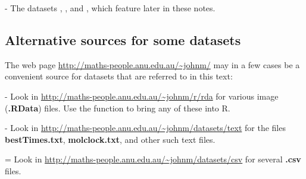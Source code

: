 \begin{itemizz}
\begin{marginfigure}[54pt]
\begin{knitrout}
\end{knitrout}
\end{marginfigure}
\begin{knitrout}
\color{fgcolor}\begin{kframe}
\begin{alltt}
 \hlkwb{<-} \hlstd{(}\hlstd{,}
                          \hlstd{=}\hlstd{)}
\end{alltt}
\end{kframe}
\end{knitrout}
\item[-] The datasets , , and
  , which feature later in these notes.
\end{itemizz}
\newpage

\subsection*{Alternative sources for some datasets}
{\color{gray40}
The web page \url{http://maths-people.anu.edu.au/~johnm/} may in a few cases
be a convenient source for datasets that are referred to in this text:
\begin{itemizz}
\item[-] 
Look in \url{http://maths-people.anu.edu.au/~johnm/r/rda} for
  various image ({\bf .RData}) files.  Use the function  to bring any of these 
  into R.
\item[-] Look in \url{http://maths-people.anu.edu.au/~johnm/datasets/text}
  for the files {\bf bestTimes.txt}, {\bf molclock.txt}, and other such
  text files.
\item[=] Look in \url{http://maths-people.anu.edu.au/~johnm/datasets/csv}
  for several {\bf .csv} files.
\end{itemizz}
\vspace*{-9pt}
}

